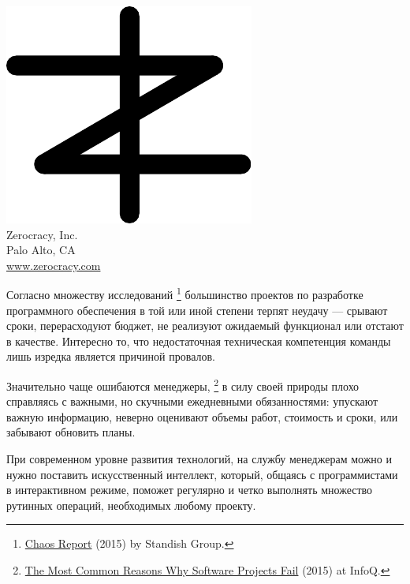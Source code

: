 \documentclass{article}
\begin{document}

\pagecolor{white}
\newcommand\slide[1]{%
  \pagebreak\topskip0pt\vspace*{\fill}%
  \begin{center}\huge%
  #1
  \end{center}%
  \vspace*{\fill}%
}

\slide{\includegraphics[scale=1]{../images/zerocracy-logo.pdf}\\
Zerocracy, Inc.\\[1em]
\large Palo Alto, CA\\
\large \href{https://www.zerocracy.com}{www.zerocracy.com}}

\slide{Согласно множеству исследований%
\footnote{%
  \href{https://www.projectsmart.co.uk/white-papers/chaos-report.pdf}{Chaos Report} (2015) by Standish Group.
}
большинство проектов по разработке программного обеспечения
в той или иной степени терпят неудачу --- срывают сроки, перерасходуют бюджет, не реализуют
ожидаемый функционал или отстают в качестве. Интересно то, что недостаточная техническая компетенция команды лишь изредка является
причиной провалов.}

\slide{Значительно чаще ошибаются менеджеры,%
\footnote{%
  \href{https://www.infoq.com/articles/software-failure-reasons}{The Most Common Reasons Why Software Projects Fail}
  (2015) at InfoQ.
}
в силу своей природы плохо справляясь с важными, но скучными ежедневными обязанностями:
упускают важную информацию, неверно оценивают объемы работ, стоимость и сроки,
или забывают обновить планы.}

\slide{При современном уровне развития технологий, на службу менеджерам можно и нужно поставить
искусственный интеллект, который, общаясь с программистами в интерактивном режиме,
поможет регулярно и четко выполнять множество рутинных операций, необходимых
любому проекту.}
\end{document}

